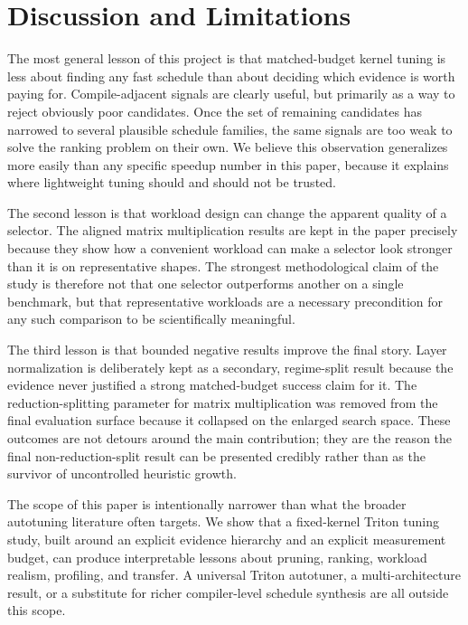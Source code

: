 \section{Discussion and Limitations}
\label{sec:discussion}

The most general lesson of this project is that matched-budget kernel tuning is less about finding any fast schedule than about deciding which evidence is worth paying for. Compile-adjacent signals are clearly useful, but primarily as a way to reject obviously poor candidates. Once the set of remaining candidates has narrowed to several plausible schedule families, the same signals are too weak to solve the ranking problem on their own. We believe this observation generalizes more easily than any specific speedup number in this paper, because it explains where lightweight tuning should and should not be trusted.

The second lesson is that workload design can change the apparent quality of a selector. The aligned matrix multiplication results are kept in the paper precisely because they show how a convenient workload can make a selector look stronger than it is on representative shapes. The strongest methodological claim of the study is therefore not that one selector outperforms another on a single benchmark, but that representative workloads are a necessary precondition for any such comparison to be scientifically meaningful.

The third lesson is that bounded negative results improve the final story. Layer normalization is deliberately kept as a secondary, regime-split result because the evidence never justified a strong matched-budget success claim for it. The reduction-splitting parameter for matrix multiplication was removed from the final evaluation surface because it collapsed on the enlarged search space. These outcomes are not detours around the main contribution; they are the reason the final non-reduction-split result can be presented credibly rather than as the survivor of uncontrolled heuristic growth.

The scope of this paper is intentionally narrower than what the broader autotuning literature often targets. We show that a fixed-kernel Triton tuning study, built around an explicit evidence hierarchy and an explicit measurement budget, can produce interpretable lessons about pruning, ranking, workload realism, profiling, and transfer. A universal Triton autotuner, a multi-architecture result, or a substitute for richer compiler-level schedule synthesis are all outside this scope.

